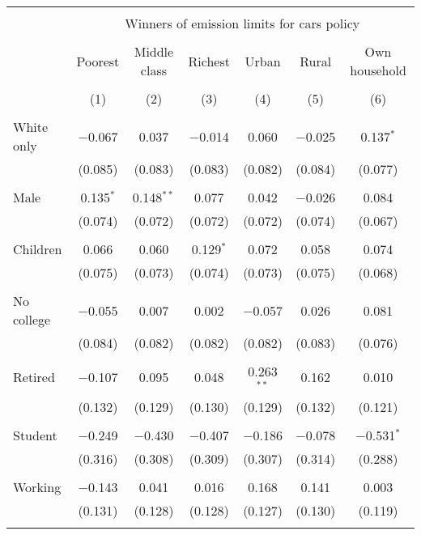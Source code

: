 
\begin{tabular}{@{\extracolsep{5pt}}lcccccc} 
\\[-1.8ex]\hline 
\hline \\[-1.8ex] 
 & \multicolumn{6}{c}{Winners of emission limits for cars policy} \\ 
\cline{2-7} 
\\[-1.8ex] & Poorest & Middle class & Richest & Urban & Rural & Own household \\ 
\\[-1.8ex] & (1) & (2) & (3) & (4) & (5) & (6)\\ 
\hline \\[-1.8ex] 
 White only & $-$0.067 & 0.037 & $-$0.014 & 0.060 & $-$0.025 & 0.137$^{*}$ \\ 
  & (0.085) & (0.083) & (0.083) & (0.082) & (0.084) & (0.077) \\ 
  & & & & & & \\ 
 Male & 0.135$^{*}$ & 0.148$^{**}$ & 0.077 & 0.042 & $-$0.026 & 0.084 \\ 
  & (0.074) & (0.072) & (0.072) & (0.072) & (0.074) & (0.067) \\ 
  & & & & & & \\ 
 Children & 0.066 & 0.060 & 0.129$^{*}$ & 0.072 & 0.058 & 0.074 \\ 
  & (0.075) & (0.073) & (0.074) & (0.073) & (0.075) & (0.068) \\ 
  & & & & & & \\ 
 No college & $-$0.055 & 0.007 & 0.002 & $-$0.057 & 0.026 & 0.081 \\ 
  & (0.084) & (0.082) & (0.082) & (0.082) & (0.083) & (0.076) \\ 
  & & & & & & \\ 
 Retired & $-$0.107 & 0.095 & 0.048 & 0.263$^{**}$ & 0.162 & 0.010 \\ 
  & (0.132) & (0.129) & (0.130) & (0.129) & (0.132) & (0.121) \\ 
  & & & & & & \\ 
 Student & $-$0.249 & $-$0.430 & $-$0.407 & $-$0.186 & $-$0.078 & $-$0.531$^{*}$ \\ 
  & (0.316) & (0.308) & (0.309) & (0.307) & (0.314) & (0.288) \\ 
  & & & & & & \\ 
 Working & $-$0.143 & 0.041 & 0.016 & 0.168 & 0.141 & 0.003 \\ 
  & (0.131) & (0.128) & (0.128) & (0.127) & (0.130) & (0.119) \\ 
  & & & & & & \\ 

\end{tabular}
